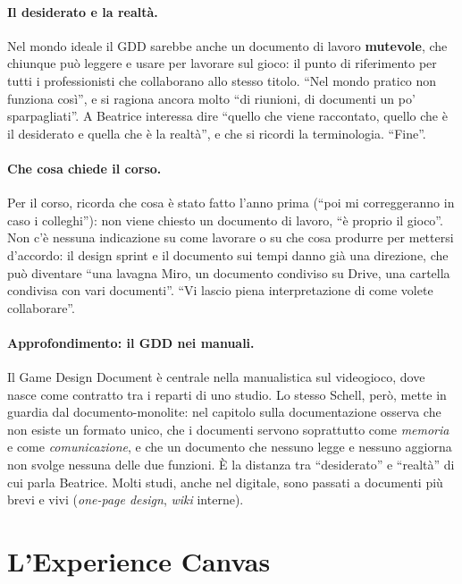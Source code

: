 \paragraph{Il desiderato e la realtà.} Nel mondo ideale il GDD sarebbe anche un
documento di lavoro \textbf{mutevole}, che chiunque può leggere e usare per lavorare
sul gioco: il punto di riferimento per tutti i professionisti che collaborano allo
stesso titolo. ``Nel mondo pratico non funziona così'', e si ragiona ancora molto ``di
riunioni, di documenti un po' sparpagliati''. A Beatrice interessa dire ``quello che
viene raccontato, quello che è il desiderato e quella che è la realtà'', e che si
ricordi la terminologia. ``Fine''.

\paragraph{Che cosa chiede il corso.} Per il corso, ricorda che cosa è stato fatto
l'anno prima (``poi mi correggeranno in caso i colleghi''): non viene chiesto un
documento di lavoro, ``è proprio il gioco''. Non c'è nessuna indicazione su come
lavorare o su che cosa produrre per mettersi d'accordo: il design sprint e il
documento sui tempi danno già una direzione, che può diventare ``una lavagna Miro, un
documento condiviso su Drive, una cartella condivisa con vari documenti''. ``Vi lascio
piena interpretazione di come volete collaborare''.

\paragraph{Approfondimento: il GDD nei manuali.} Il Game Design Document è centrale
nella manualistica sul videogioco, dove nasce come contratto tra i reparti di uno
studio. Lo stesso Schell, però, mette in guardia dal documento-monolite: nel
capitolo sulla documentazione osserva che non esiste un formato unico, che i documenti
servono soprattutto come \emph{memoria} e come \emph{comunicazione}, e che un
documento che nessuno legge e nessuno aggiorna non svolge nessuna delle due funzioni.
È la distanza tra ``desiderato'' e ``realtà'' di cui parla Beatrice. Molti studi,
anche nel digitale, sono passati a documenti più brevi e vivi (\emph{one-page
design}, \emph{wiki} interne).

\section{L'Experience Canvas}
\label{a9:sec:canvas}

